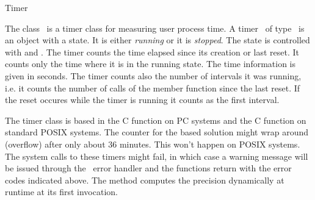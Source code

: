 
\begin{ccRefClass}{Timer}

\ccDefinition


The class \ccRefName\ is a timer class for measuring user process time.
A timer \ccVar\ of type \ccRefName\ is an object with a state. It is
either {\em running\/} or it is {\em stopped}. The state is controlled
with  and . The timer counts the
time elapsed since its creation or last reset. It counts only the time
where it is in the running state. The time information is given in seconds.
The timer counts also the number of intervals it was running, i.e. it 
counts the number of calls of the  member function since the 
last reset. If the reset occures while the timer is running it counts as the
first interval.


\ccCreation

\ccPropagateThreeToTwoColumns


\ccOperations

\ccGlue
{}
\ccGlue
{}
\ccGlue
{}

\ccGlue
{} 
\ccGlue
{}
\ccGlue
{}


\ccImplementation

The timer class is based in the C function  on
PC systems and the C function  on standard
POSIX systems. The counter for the  based
solution might wrap around (overflow) after only about 36
minutes. This won't happen on POSIX systems. The system calls to these
timers might fail, in which case a warning message will be issued
through the \cgal\ error handler and the functions return with the
error codes indicated above. The  method computes the
precision dynamically at runtime at its first invocation.


\end{ccRefClass}
